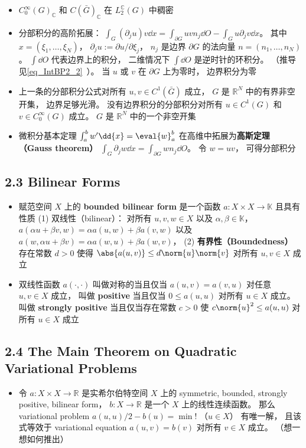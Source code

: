 \begin{itemize}
\item $C_0^\infty(G)_{\mathbb C}$ 和 $C(\bar G)_{\mathbb C}$  在 $L_2^{\mathbb C}(G)$ 中稠密

\item 分部积分的高阶拓展： $\int_G (\partial_j u) v\dd{x} = \int_{\partial G} uvn_j \dd{O} - \int_G u \partial_j v\dd{x}$。 其中 $x = (\xi_1, \dots, \xi_N)$， $\partial_j u := \partial u/\partial\xi_j$， $n_j$ 是边界 $\partial G$ 的法向量 $n = (n_1, \dots, n_N)$。 $\int\dd{O}$ 代表边界上的积分， 二维情况下 $\int\dd{O}$ 是逆时针的环积分。 （推导见\autoref{eq_IntBP2_2}~）。 当 $u$ 或 $v$ 在 $\partial G$ 上为零时， 边界积分为零

\item 上一条的分部积分公式对所有 $u, v \in C^1(\bar G)$ 成立， $G$ 是 $\mathbb R^N$ 中的有界非空开集， 边界足够光滑。 没有边界积分的分部积分对所有 $u \in C^1(G)$ 和 $v \in C_0^\infty(G)$ 成立。 $G$ 是 $\mathbb R^N$ 中的一个非空开集

\item 微积分基本定理 $\int_a^b w' \dd{x} = \eval{w}_a^b$ 在高维中拓展为\textbf{高斯定理（Gauss theorem）} $\int_G \partial_j w \dd{x} = \int_{\partial G} wn_j\dd{O}$。 令 $w = uv$， 可得分部积分
\end{itemize}

\subsection{2.3 Bilinear Forms}
\begin{itemize}
\item 赋范空间 $X$ 上的 \textbf{bounded bilinear form} 是一个函数 $a: X\times X\to\mathbb K$ 且具有性质 (1) 双线性（bilinear）： 对所有 $u, v, w\in X$ 以及 $\alpha, \beta \in \mathbb K$， $a(\alpha u + \beta v, w) = \alpha a(u, w) + \beta a(v, w)$ 以及 $a(w, \alpha u + \beta v) = \alpha a(w, u) + \beta a(w, v)$， (2) \textbf{有界性（Boundedness）} 存在常数 $d > 0$ 使得 $\abs{a(u, v)} \le d\norm{u}\norm{v}$ 对所有 $u, v\in X$ 成立

\item 双线性函数 $a(\cdot,\cdot)$ 叫做对称的当且仅当 $a(u, v) = a(v, u)$ 对任意 $u, v\in X$ 成立， 叫做 \textbf{positive} 当且仅当 $0\le a(u,u)$ 对所有 $u\in X$ 成立。 叫做 \textbf{strongly positive} 当且仅当存在常数 $c > 0$ 使 $c\norm{u}^2 \le a(u, u)$ 对所有 $u\in X$ 成立
\end{itemize}

\subsection{2.4 The Main Theorem on Quadratic Variational Problems}
\begin{itemize}
\item 令 $a: X\times X\to\mathbb R$ 是实希尔伯特空间 $X$ 上的 symmetric, bounded, strongly positive, bilinear form， $b: X\to\mathbb R$ 是一个 $X$ 上的线性连续函数。 那么 variational problem $a(u, u)/2 - b(u) = \min!$ （$u\in X$） 有唯一解， 且该式等效于 variational equation $a(u, v) = b(v)$ 对所有 $v\in X$ 成立。 （想一想如何推出）
\end{itemize}

